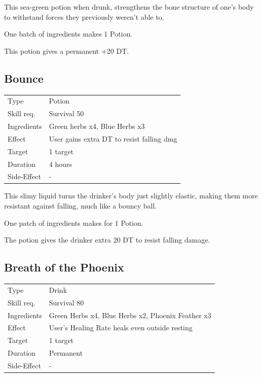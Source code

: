 \documentclass[11pt,a4paper,twocolumn]{book}
\begin{document}
\medskip

This sea-green potion when drunk, strengthens the bone structure of one's body to withstand forces they previously weren't able to.

One batch of ingredients makes 1 Potion.

This potion gives a permanent +20 DT.


\subsection*{Bounce}
{
	\begin{tabu} to 75mm{| X[l,4] | X[l,8] |}
		\hline
		Type 			& Potion 													\\
        Skill req.	    & Survival 50 												\\
        Ingredients     & Green herbs x4, Blue Herbs x3								\\
        Effect     		& User gains extra DT to resist falling dmg					\\
        Target      	& 1 target													\\
        Duration  		& 4 hours	 												\\
        Side-Effect     & -															\\ \hline
	\end{tabu}
		
}

\medskip

This slimy liquid turns the drinker's body just slightly elastic, making them more resistant against falling, much like a bouncy ball.

One patch of ingredients makes for 1 Potion.

The potion gives the drinker extra 20 DT to resist falling damage.

\vfill


\subsection*{Breath of the Phoenix}
{
	\begin{tabu} to 75mm{| X[l,4] | X[l,8] |}
		\hline
		Type 			& Drink 													\\
        Skill req.	    & Survival 80 												\\
        Ingredients     & Green Herbs x4, Blue Herbs x2, Phoenix Feather x3			\\
        Effect     		& User's Healing Rate heals even outside resting			\\
        Target      	& 1 target													\\
        Duration  		& Permanent 												\\
        Side-Effect     & -															\\ \hline
	\end{tabu}
		
}
\end{document}
